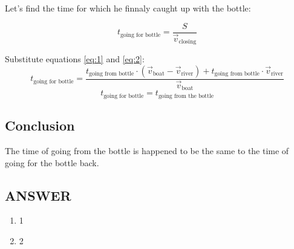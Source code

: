 Let's find the time for which he finnaly caught up with the bottle:

$$t_{\text{going for bottle}} = \frac{S}{\Vec{v}_\text{closing}}$$

Substitute equations \eqref{eq:1} and \eqref{eq:2}:
$$t_{\text{going for bottle}} = \frac{t_{\text{going from bottle}} \cdot (\Vec{v}_{\text{boat}} - \Vec{v}_{\text{river}}) + t_{\text{going from bottle}} \cdot \Vec{v}_{\text{river}}}{\Vec{v}_{\text{boat}}}$$ 
$$ t_{\text{going for bottle}} = t_\text{going from the bottle} $$

\subsection*{Conclusion}
The time of going from the bottle is happened to be the same to the time of going for the bottle back.




\vfill
\subsection*{ANSWER}
\begin{enumerate}
    \item 1
    \item 2
\end{enumerate}

